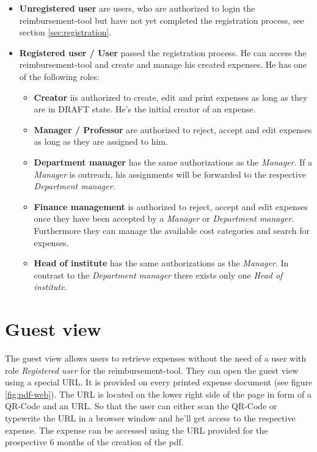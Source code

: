 \begin{itemize}
    \item \textbf{Unregistered user} are users, who are authorized to login the reimbursement-tool but have not yet completed the registration process, see section \ref{sec:registration}.
    \item \textbf{Registered user / User} passed the registration process. He can access the reimbursement-tool and create and manage his created expenses. He has one of the following roles:

    \begin{itemize}
        \item \textbf{Creator} iis authorized to create, edit and print expenses as long as they are in DRAFT state. He's the initial creator of an expense.

        \item \textbf{Manager / Professor} are authorized to reject, accept and edit expenses as long as they are assigned to him.

        \item \textbf{Department manager} has the same authorizations as the \textit{Manager}. If a \textit{Manager} is outreach, his assignments will be forwarded to the respective \textit{Department manager}.

        \item \textbf{Finance management} is authorized to reject, accept and edit expenses once they have been accepted by a \textit{Manager} or \textit{Department manager}. Furthermore they can manage the available cost categories and search for expenses.

        \item \textbf{Head of institute} has the same authorizations as the \textit{Manager}. In contrast to the \textit{Department manager} there exists only one \textit{Head of institute}.
    \end{itemize}
\end{itemize}

\section*{Guest view}
The guest view allows users to retrieve expenses without the need of a user with role \textit{Registered user} for the reimbursement-tool. They can open the guest view using a special URL. It is provided on every printed expense document (see figure \ref{fig:pdf-web}). The URL is located on the lower right side of the page in form of a QR-Code and an URL. So that the user can either scan the QR-Code or typewrite the URL in a browser window and he'll get access to the respective expense. \newline
The expense can be accessed using the URL provided for the prospective 6 months of the creation of the pdf.

